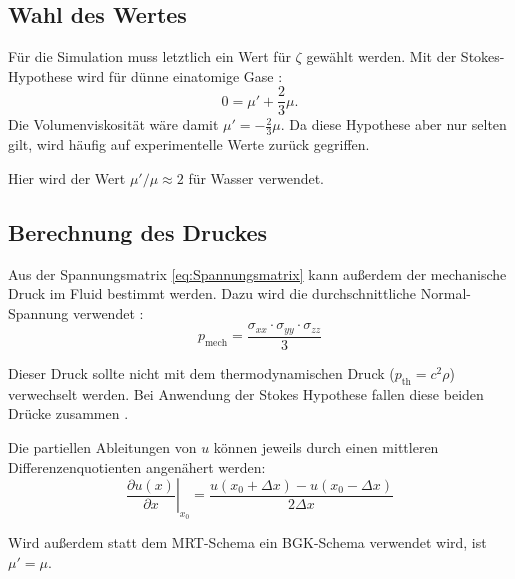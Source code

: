 \subsection{Wahl des Wertes}
Für die Simulation muss letztlich ein Wert für $\zeta$ gewählt werden. 
Mit der Stokes-Hypothese wird für dünne einatomige Gase \cite{Graves1999}:
\begin{equation}
 0 = \mu' + \frac{2}{3} \mu.
\end{equation}
Die Volumenviskosität wäre damit $\mu' = - \frac{2}{3} \mu$. Da diese Hypothese aber nur selten gilt, wird häufig auf experimentelle Werte zurück gegriffen.

Hier wird der Wert $\mu' / \mu \approx 2$ für Wasser \cite{Rosenhead1954} verwendet.

\subsection{Berechnung des Druckes}
Aus der Spannungsmatrix \eqref{eq:Spannungsmatrix} kann außerdem der mechanische Druck im Fluid bestimmt werden.
Dazu wird die durchschnittliche Normal-Spannung verwendet \cite{Graves1999}:
\begin{equation}
 p_{\text{mech}} = \frac{\sigma_{xx} \cdot \sigma_{yy} \cdot \sigma_{zz}}{3}
\end{equation}

Dieser Druck sollte nicht mit dem thermodynamischen Druck ($p_{\text{th}}=c^2 \rho$) verwechselt werden. Bei Anwendung der Stokes Hypothese fallen diese beiden Drücke zusammen \cite{Graves1999}.

Die partiellen Ableitungen von $u$ können jeweils durch einen mittleren Differenzenquotienten angenähert werden:
\begin{equation}
 \left. \frac{\partial u(x)}{\partial x}\right|_{x_0} = \frac{u(x_0 + \Delta x) - u(x_0 - \Delta x)}{2 \Delta x}
\end{equation}

Wird außerdem statt dem MRT-Schema ein BGK-Schema verwendet wird, ist $\mu' =  \mu$.

